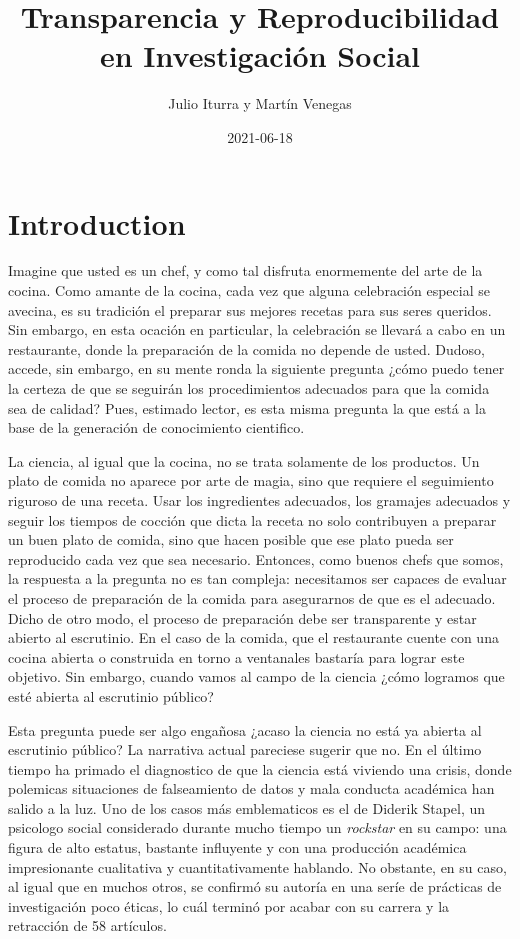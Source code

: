 \documentclass[
]{book}
\title{Transparencia y Reproducibilidad en Investigación Social}
\author{Julio Iturra y Martín Venegas}
\date{2021-06-18}
\begin{document}
\maketitle

{
\setcounter{tocdepth}{1}
\tableofcontents
}
\hypertarget{intro}{%
\chapter{Introduction}\label{intro}}

Imagine que usted es un chef, y como tal disfruta enormemente del arte de la cocina. Como amante de la cocina, cada vez que alguna celebración especial se avecina, es su tradición el preparar sus mejores recetas para sus seres queridos. Sin embargo, en esta ocación en particular, la celebración se llevará a cabo en un restaurante, donde la preparación de la comida no depende de usted. Dudoso, accede, sin embargo, en su mente ronda la siguiente pregunta ¿cómo puedo tener la certeza de que se seguirán los procedimientos adecuados para que la comida sea de calidad? Pues, estimado lector, es esta misma pregunta la que está a la base de la generación de conocimiento cientifico.

La ciencia, al igual que la cocina, no se trata solamente de los productos. Un plato de comida no aparece por arte de magia, sino que requiere el seguimiento riguroso de una receta. Usar los ingredientes adecuados, los gramajes adecuados y seguir los tiempos de cocción que dicta la receta no solo contribuyen a preparar un buen plato de comida, sino que hacen posible que ese plato pueda ser reproducido cada vez que sea necesario. Entonces, como buenos chefs que somos, la respuesta a la pregunta no es tan compleja: necesitamos ser capaces de evaluar el proceso de preparación de la comida para asegurarnos de que es el adecuado. Dicho de otro modo, el proceso de preparación debe ser transparente y estar abierto al escrutinio. En el caso de la comida, que el restaurante cuente con una cocina abierta o construida en torno a ventanales bastaría para lograr este objetivo. Sin embargo, cuando vamos al campo de la ciencia ¿cómo logramos que esté abierta al escrutinio público?

Esta pregunta puede ser algo engañosa ¿acaso la ciencia no está ya abierta al escrutinio público? La narrativa actual pareciese sugerir que no. En el último tiempo ha primado el diagnostico de que la ciencia está viviendo una crisis, donde polemicas situaciones de falseamiento de datos y mala conducta académica han salido a la luz. Uno de los casos más emblematicos es el de Diderik Stapel, un psicologo social considerado durante mucho tiempo un \emph{rockstar} en su campo: una figura de alto estatus, bastante influyente y con una producción académica impresionante cualitativa y cuantitativamente hablando. No obstante, en su caso, al igual que en muchos otros, se confirmó su autoría en una seríe de prácticas de investigación poco éticas, lo cuál terminó por acabar con su carrera y la retracción de 58 artículos.
\end{document}
